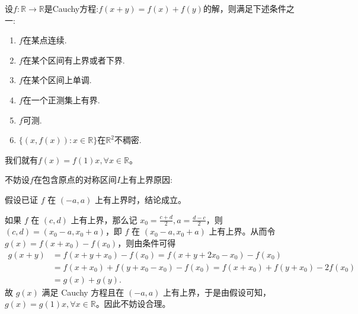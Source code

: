 \documentclass[../../main.tex]{subfiles}
\begin{document}
\begin{theorem}[Cauchy方程基本定理]\label{theorem:Cauchy方程基本定理}
设\(f:\mathbb{R}\to\mathbb{R}\)是Cauchy方程:$f(x + y)=f(x)+f(y)$的解，则满足下述条件之一:
\begin{enumerate}
\item \(f\)在某点连续.

\item  \(f\)在某个区间有上界或者下界.

\item  \(f\)在某个区间上单调.

\item  \(f\)在一个正测集上有界.

\item   \(f\)可测.

\item \(\{(x,f(x)):x\in\mathbb{R}\}\)在\(\mathbb{R}^2\)不稠密.
\end{enumerate}
我们就有\(f(x)=f(1)x,\forall x\in\mathbb{R}\)。
\end{theorem}
\begin{remark}
\hypertarget{不妨设的原因112}{不妨设\(f\)在包含原点的对称区间\(I\)上有上界原因:}假设已证 \(f\) 在 \((-a,a)\) 上有上界时，结论成立。

如果 \(f\) 在 \((c,d)\) 上有上界，那么记 \(x_0 = \frac{c + d}{2},a = \frac{d - c}{2}\)，则 \((c,d)=(x_0 - a,x_0 + a)\)，即
\(f\) 在 \((x_0 - a,x_0 + a)\) 上有上界。从而令 \(g(x)=f(x + x_0)-f(x_0)\)，则由条件可得
\begin{align*}
g(x + y)&=f(x + y + x_0)-f(x_0)
=f(x + y + 2x_0 - x_0)-f(x_0)\\
&=f(x + x_0)+f(y + x_0 - x_0)-f(x_0)
=f(x + x_0)+f(y + x_0)-2f(x_0)\\
&=g(x)+g(y).
\end{align*}
故 \(g(x)\) 满足 Cauchy 方程且在 \((-a,a)\) 上有上界，于是由假设可知，\(g(x)=g(1)x,\forall x\in \mathbb{R}\)。因此不妨设合理。
\end{remark}
\end{document}
